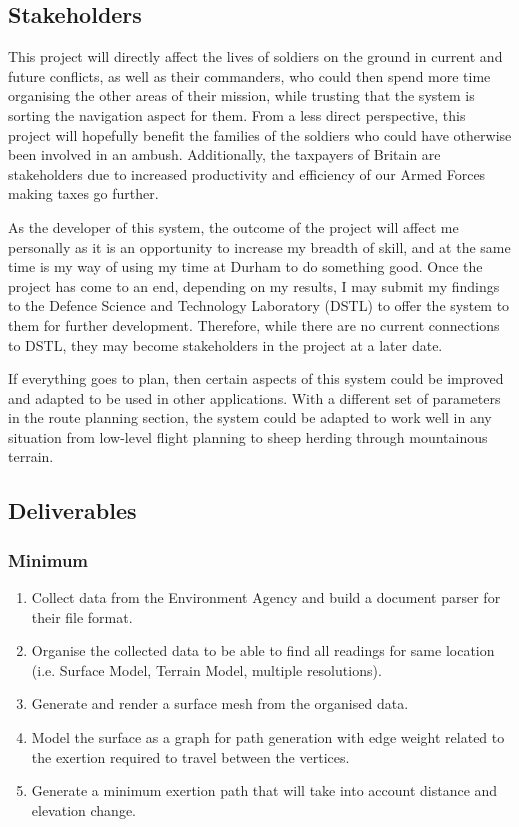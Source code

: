\documentclass[12pt,a4paper]{article}
\begin{document}
  \subsection{Stakeholders}
  \noindent This project will directly affect the lives of soldiers on the ground in current and future conflicts, as well as their commanders, who could then spend more time organising the other areas of their mission, while trusting that the system is sorting the navigation aspect for them. From a less direct perspective, this project will hopefully benefit the families of the soldiers who could have otherwise been involved in an ambush. Additionally, the taxpayers of Britain are stakeholders due to increased productivity and efficiency of our Armed Forces making taxes go further.

  \par As the developer of this system, the outcome of the project will affect me personally as it is an opportunity to increase my breadth of skill, and at the same time is my way of using my time at Durham to do something good. Once the project has come to an end, depending on my results, I may submit my findings to the Defence Science and Technology Laboratory (DSTL) to offer the system to them for further development. Therefore, while there are no current connections to DSTL, they may become stakeholders in the project at a later date.

  \par If everything goes to plan, then certain aspects of this system could be improved and adapted to be used in other applications. With a different set of parameters in the route planning section, the system could be adapted to work well in any situation from low-level flight planning to sheep herding through mountainous terrain.

  \subsection{Deliverables}
  \subsubsection{Minimum}
  \begin{enumerate}
    \item Collect data from the Environment Agency and build a document parser for their file format.
    \item Organise the collected data to be able to find all readings for same location (i.e. Surface Model, Terrain Model, multiple resolutions).
    \item Generate and render a surface mesh from the organised data.
    \item Model the surface as a graph for path generation with edge weight related to the exertion required to travel between the vertices.
    \item Generate a minimum exertion path that will take into account distance and elevation change.
  \end{enumerate}
\end{document}
